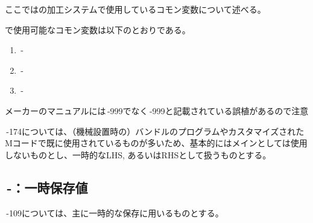 

ここでは\DMC の加工システムで使用しているコモン変数について述べる。


\DMC で使用可能なコモン変数は以下のとおりである。
\begin{enumerate}
\item {}\,-
\item {}\,-
\item {}\,-
\end{enumerate}
\begin{marker}
メーカーのマニュアルには\,-\ttNum999でなく\,-\ttNum999と記載されている誤植があるので注意
\end{marker}



\,-\ttNum174については、（機械設置時の）バンドルのプログラムやカスタマイズされたMコードで既に使用されているものが多いため、基本的にはメインとしては使用しないものとし、一時的なLHS, あるいはRHSとして扱うものとする。


\subsection{\,-：一時保存値}
\noindent{}\,-\ttNum109については、主に一時的な保存に用いるものとする。\\

